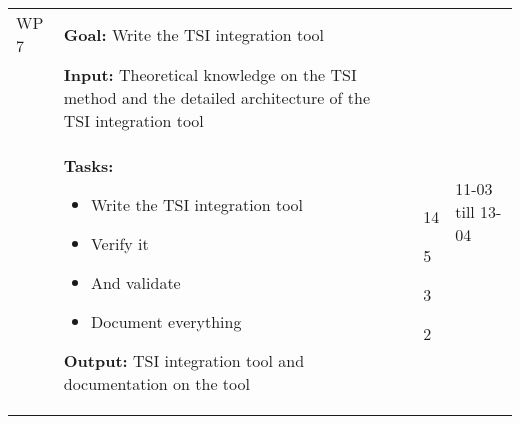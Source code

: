 \begin{longtable}{|p{2cm}|p{10cm}|p{1cm}|p{1cm}|}

WP 7 & \textbf{Goal:} Write the \ac{TSI} integration tool &  & \multirow{3}{1cm}{11-03 till 13-04} \\ 
&\textbf{Input:} Theoretical knowledge on the \ac{TSI} method and the detailed architecture of the \ac{TSI} integration tool & & \\
& \textbf{Tasks:}
\begin{itemize}
\item Write the \ac{TSI} integration tool
\item Verify it
\item And validate 
\item Document everything
\end{itemize} 
\textbf{Output:} \ac{TSI} integration tool and documentation on the tool & \noindent \begin{itemize}[leftmargin=*]
\item[14] 
\item[5]
\item[3]
\item[2]
\end{itemize} & \\ \hline



\end{longtable}
